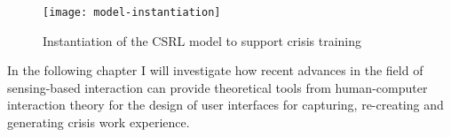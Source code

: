 \begin{figure}
	[htb] \centering 
	\texttt{[image: model-instantiation]} \caption{Instantiation of the CSRL model to support crisis training} \label{fig:model-instantiation} 
\end{figure}

In the following chapter I will investigate how recent advances in the field of sensing-based interaction can provide theoretical tools from human-computer interaction theory for the design of user interfaces for capturing, re-creating and generating crisis work experience. 
